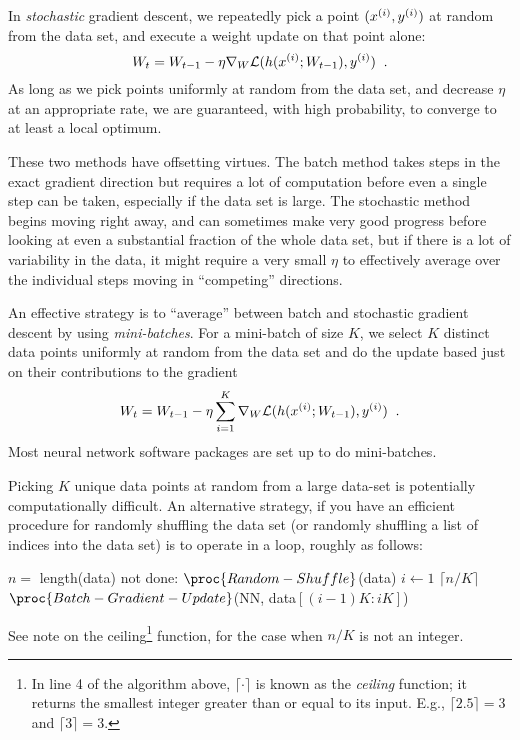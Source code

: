 In {\em stochastic} gradient descent, we repeatedly pick a point
$(x^{(i)}, y^{(i)})$ at random from the data set, and execute a
weight update on that point alone:
\[W_t = W_{t-1} - \eta \nabla_W \mathcal{L}(h(x^{(i)}; W_{t-1}),
  y^{(i)})\;\;.\]
As long as we pick points uniformly at random from the data set, and
decrease $\eta$ at an appropriate rate, we are guaranteed, with high
probability, to converge to at least a local optimum.

These two methods have offsetting virtues.  The batch method takes
steps in the exact gradient direction but requires a lot of
computation before even a single step can be taken, especially if the
data set is large.  The stochastic method begins moving right away,
and can sometimes make very good progress before looking at even a
substantial fraction of the whole data set, but if there is a lot of
variability in the data, it might require a very small $\eta$ to
effectively average over the individual steps moving in ``competing''
directions.

An effective strategy is to ``average'' between batch and stochastic
gradient descent by using {\em mini-batches}.  For a mini-batch of
size $K$, we select $K$ distinct data points uniformly at random from the data
set and do the update based just on their contributions to the gradient
\[W_t = W_{t-1} - \eta\sum_{i=1}^K \nabla_W \mathcal{L}(h(x^{(i)}; W_{t-1}),
  y^{(i)})\;\;.\]
Most neural network software packages are set up to do mini-batches.

Picking $K$ unique data points at random from a large data-set is
potentially computationally difficult.  An alternative strategy, if
you have an efficient procedure for randomly shuffling the data set
(or randomly shuffling a list of indices into the data set) is to
operate in a loop, roughly as follows:

\begin{codebox}
  \li     $n = $ length(data)
  \li     \While not done:
  \Do
  \li        $\proc{Random-Shuffle}$(data)
  \li        \For $i \gets 1$ \To $\lceil n/K \rceil$
  \Do
  \li           $\proc{Batch-Gradient-Update}$(NN, data$[(i - 1)K:iK]$)
  \End
  \End
\end{codebox}
See note on the ceiling\footnote{
  In line 4 of the algorithm above, $\lceil \cdot \rceil$ is known
  as the \emph{ceiling} function; it returns the smallest
  integer greater than or equal to its input. E.g., $\lceil 2.5 \rceil = 3$ and $\lceil 3 \rceil = 3$.}
function, for the case when $n/K$ is not an integer.

